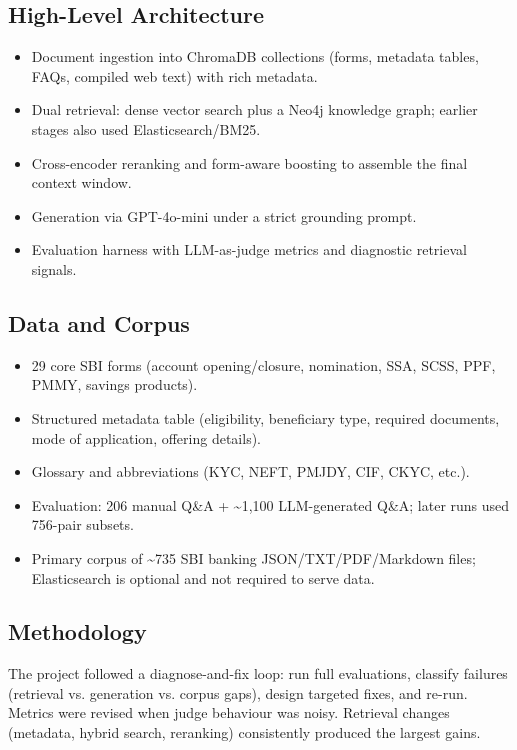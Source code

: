 \documentclass[11pt,a4paper]{article}
\begin{document}
\subsection{High-Level Architecture}
\begin{itemize}[leftmargin=1.2cm]
    \item Document ingestion into ChromaDB collections (forms, metadata tables, FAQs, compiled web text) with rich metadata.
    \item Dual retrieval: dense vector search plus a Neo4j knowledge graph; earlier stages also used Elasticsearch/BM25.
    \item Cross-encoder reranking and form-aware boosting to assemble the final context window.
    \item Generation via GPT-4o-mini under a strict grounding prompt.
    \item Evaluation harness with LLM-as-judge metrics and diagnostic retrieval signals.
\end{itemize}

\subsection{Data and Corpus}
\begin{itemize}[leftmargin=1.2cm]
    \item 29 core SBI forms (account opening/closure, nomination, SSA, SCSS, PPF, PMMY, savings products).
    \item Structured metadata table (eligibility, beneficiary type, required documents, mode of application, offering details).
    \item Glossary and abbreviations (KYC, NEFT, PMJDY, CIF, CKYC, etc.).
    \item Evaluation: 206 manual Q\&A + \textasciitilde1{,}100 LLM-generated Q\&A; later runs used 756-pair subsets.
    \item Primary corpus of \textasciitilde735 SBI banking JSON/TXT/PDF/Markdown files; Elasticsearch is optional and not required to serve data.
\end{itemize}

\subsection{Methodology}
The project followed a diagnose-and-fix loop: run full evaluations, classify failures (retrieval vs. generation vs. corpus gaps), design targeted fixes, and re-run. Metrics were revised when judge behaviour was noisy. Retrieval changes (metadata, hybrid search, reranking) consistently produced the largest gains.
\end{document}
